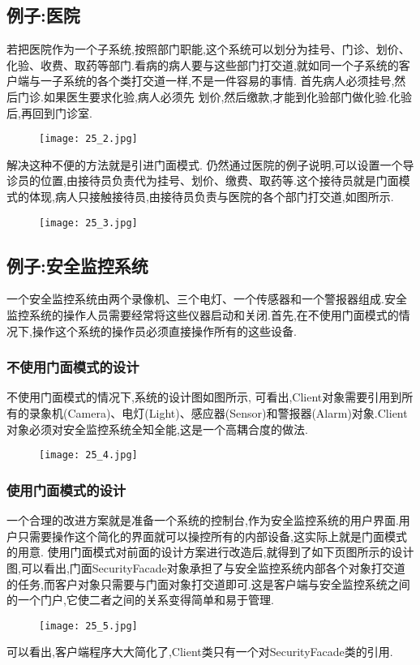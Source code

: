 \documentclass[../main.tex]{subfiles}
\begin{document}
\subsection{例子:医院}
若把医院作为一个子系统,按照部门职能,这个系统可以划分为挂号、门诊、划价、化验、收费、取药等部门.看病的病人要与这些部门打交道,就如同一个子系统的客户端与一子系统的各个类打交道一样,不是一件容易的事情.
首先病人必须挂号,然后门诊.如果医生要求化验,病人必须先 划价,然后缴款,才能到化验部门做化验.化验后,再回到门诊室.
%
\begin{figure}[H]
  \texttt{[image: 25\_2.jpg]}
\end{figure}
%
解决这种不便的方法就是引进门面模式.
仍然通过医院的例子说明,可以设置一个导诊员的位置,由接待员负责代为挂号、划价、缴费、取药等.这个接待员就是门面模式的体现,病人只接触接待员,由接待员负责与医院的各个部门打交道,如图所示.
%
\begin{figure}[H]
  \texttt{[image: 25\_3.jpg]}
\end{figure}
%
\subsection{例子:安全监控系统}
一个安全监控系统由两个录像机、三个电灯、一个传感器和一个警报器组成.安全监控系统的操作人员需要经常将这些仪器启动和关闭.首先,在不使用门面模式的情况下,操作这个系统的操作员必须直接操作所有的这些设备.
%
\subsubsection{不使用门面模式的设计}
不使用门面模式的情况下,系统的设计图如图所示, 可看出,Client对象需要引用到所有的录象机(Camera)、电灯(Light)、感应器(Sensor)和警报器(Alarm)对象.Client对象必须对安全监控系统全知全能,这是一个高耦合度的做法.
%
\begin{figure}[H]
  \texttt{[image: 25\_4.jpg]}
\end{figure}
%





%
\subsubsection{使用门面模式的设计}
一个合理的改进方案就是准备一个系统的控制台,作为安全监控系统的用户界面.用户只需要操作这个简化的界面就可以操控所有的内部设备,这实际上就是门面模式的用意.
使用门面模式对前面的设计方案进行改造后,就得到了如下页图所示的设计图,可以看出,门面SecurityFacade对象承担了与安全监控系统内部各个对象打交道的任务,而客户对象只需要与门面对象打交道即可.这是客户端与安全监控系统之间的一个门户,它使二者之间的关系变得简单和易于管理.
%
\begin{figure}[H]
  \texttt{[image: 25\_5.jpg]}
\end{figure}
%


%
可以看出,客户端程序大大简化了,Client类只有一个对SecurityFacade类的引用.
\end{document}
